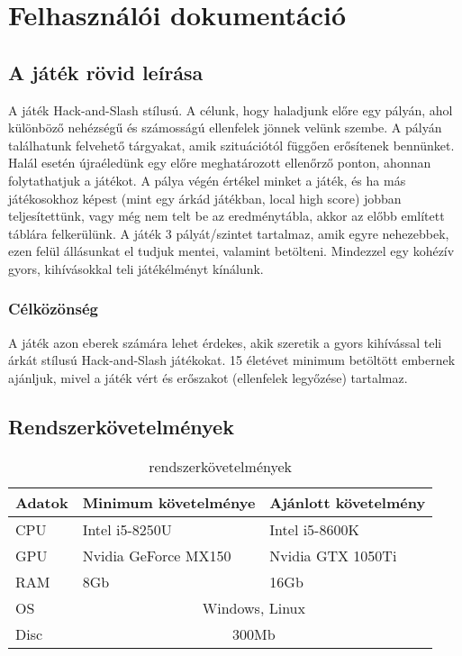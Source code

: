 \chapter{Felhasználói dokumentáció} %
\label{ch:user}

\section{A játék rövid leírása}
A játék Hack-and-Slash stílusú. A célunk, hogy haladjunk előre egy pályán, ahol különböző nehézségű és számosságú ellenfelek jönnek velünk szembe. A pályán találhatunk felvehető tárgyakat, amik szituációtól függően erősítenek bennünket. Halál esetén újraéledünk egy előre meghatározott ellenőrző ponton, ahonnan folytathatjuk a játékot. A pálya végén értékel minket a játék, és ha más játékosokhoz képest (mint egy árkád játékban, local high score) jobban teljesítettünk, vagy még nem telt be az eredménytábla, akkor az előbb említett táblára felkerülünk. A játék 3 pályát/szintet tartalmaz, amik egyre nehezebbek, ezen felül állásunkat el tudjuk mentei, valamint betölteni. Mindezzel egy kohézív gyors, kihívásokkal teli játékélményt kínálunk.
\subsection{Célközönség}
A játék azon eberek számára lehet érdekes, akik szeretik a gyors kihívással teli árkát stílusú Hack-and-Slash játékokat. 15 életévet minimum betöltött embernek ajánljuk, mivel a játék vért és erőszakot (ellenfelek legyőzése) tartalmaz.
\cleardoublepage
\section{Rendszerkövetelmények}
\begin{table}[htb]
	\centering
	\begin{tabular}{ | m{} | m{} | m{} | }
		\hline
		\textbf{Adatok} & \textbf{Minimum követelménye} & \textbf{Ajánlott követelmény} \\
		\hline \hline
		CPU & Intel i5-8250U & Intel i5-8600K \\ \hline
		GPU & Nvidia GeForce MX150 & Nvidia GTX 1050Ti \\ \hline
		RAM & 8Gb & 16Gb \\ \hline
		OS & \multicolumn{2}{c|}{Windows, Linux} \\
		\hline
		Disc & \multicolumn{2}{c|}{300Mb} \\
		\hline
	\end{tabular}
	\caption{rendszerkövetelmények}
	\label{sysReq}
\end{table}
